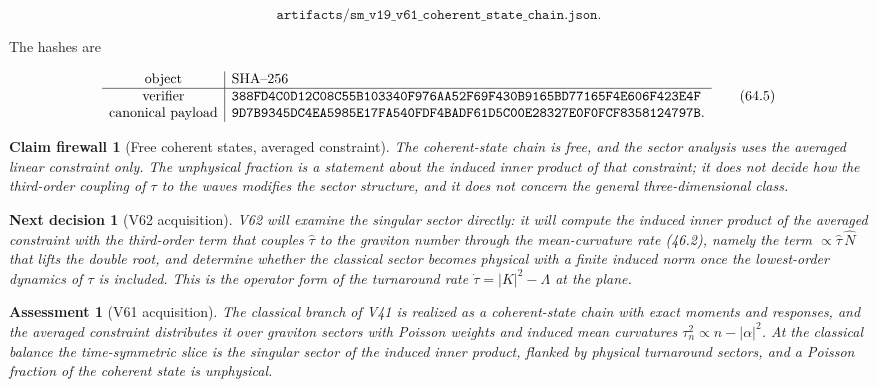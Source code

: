 \documentclass[11pt]{article}
\newtheorem{firewall}[theorem]{Claim firewall}
\newtheorem{decision}[theorem]{Next decision}
\newtheorem{assessment}[theorem]{Assessment}
\theoremstyle{remark}
\begin{document}
\[
 \texttt{artifacts/sm\_v19\_v61\_coherent\_state\_chain.json}.       \tag{64.4}
\]

The hashes are

\[
\begin{array}{c|l}
\hbox{object}&\hbox{SHA--256}\\ \hline
\hbox{verifier}&
\texttt{388FD4C0D12C08C55B103340F976AA52F69F430B9165BD77165F4E606F423E4F}\\
\hbox{canonical payload}&
\texttt{9D7B9345DC4EA5985E17FA540FDF4BADF61D5C00E28327E0F0FCF8358124797B}.
\end{array}                                                     \tag{64.5}
\]

\begin{firewall}[Free coherent states, averaged constraint]
\label{fire:v19v61}
The coherent-state chain is free, and the sector analysis uses the
averaged linear constraint only.  The unphysical fraction is a
statement about the induced inner product of that constraint; it does
not decide how the third-order coupling of \(\tau\) to the waves
modifies the sector structure, and it does not concern the general
three-dimensional class.
\end{firewall}

\begin{decision}[V62 acquisition]
\label{dec:v19v61-next}
V62 will examine the singular sector directly: it will compute the
induced inner product of the averaged constraint with the third-order
term that couples \(\hat\tau\) to the graviton number through the
mean-curvature rate (46.2), namely the term \(\propto\hat\tau\,\widehat N\)
that lifts the double root, and determine whether the classical sector
becomes physical with a finite induced norm once the lowest-order
dynamics of \(\tau\) is included.  This is the operator form of the
turnaround rate \(\dot\tau=|K|^2-\Lambda\) at the plane.
\end{decision}

\begin{assessment}[V61 acquisition]
\label{ass:v19v61}
The classical branch of V41 is realized as a coherent-state chain with
exact moments and responses, and the averaged constraint distributes it
over graviton sectors with Poisson weights and induced mean curvatures
\(\tau_n^2\propto n-|\alpha|^2\).  At the classical balance the
time-symmetric slice is the singular sector of the induced inner
product, flanked by physical turnaround sectors, and a Poisson
fraction of the coherent state is unphysical.
\end{assessment}
\end{document}
